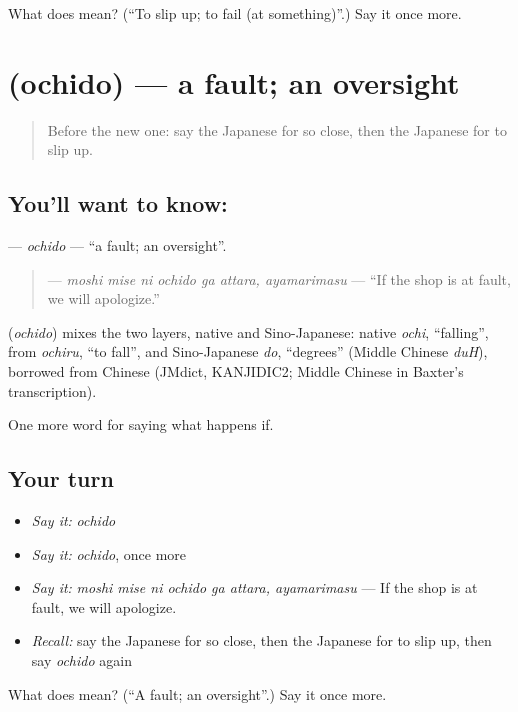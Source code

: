 \begin{tcolorbox}[breakable,colback=teal!4,colframe=teal!35!black,title={Before you move on}]
What does  mean? (\textquotedblleft{}To slip up; to fail (at something)\textquotedblright{}.) Say it once more.
\end{tcolorbox}
\section[\texorpdfstring{\ja{おちど} (ochido)}{おちど (ochido)}]{ (ochido) — a fault; an oversight}

\label{lesson:JA-C518-ochido}



\begin{quote}
Before the new one: say the Japanese for so close, then the Japanese for to slip up.
\end{quote}

\subsection*{You'll want to know: }
\textbf{} — \emph{ochido} — \textquotedblleft{}a fault; an oversight\textquotedblright{}.

\begin{quote}
\textbf{   } — \emph{moshi mise ni ochido ga attara, ayamarimasu} — \textquotedblleft{}If the shop is at fault, we will apologize.\textquotedblright{}
\end{quote}

\begin{cousinweb}
\textbf{} (\emph{ochido}) mixes the two layers, native and Sino-Japanese: native \emph{ochi}, \textquotedblleft{}falling\textquotedblright{}, from \emph{ochiru}, \textquotedblleft{}to fall\textquotedblright{}, and Sino-Japanese \emph{do}, \textquotedblleft{}degrees\textquotedblright{} (Middle Chinese \emph{duH}), borrowed from Chinese (JMdict, KANJIDIC2; Middle Chinese in Baxter's transcription).
\end{cousinweb}

\begin{grammarlens}[title={What you've built}]
One more word for saying what happens if.
\end{grammarlens}

\subsection*{Your turn}
\begin{itemize}
\raggedright
  \item \emph{Say it:} \emph{ochido}
  \item \emph{Say it:} \emph{ochido}, once more
  \item \emph{Say it:} \emph{moshi mise ni ochido ga attara, ayamarimasu} — If the shop is at fault, we will apologize.
  \item \emph{Recall:} say the Japanese for so close, then the Japanese for to slip up, then say \emph{ochido} again
\end{itemize}

\begin{tcolorbox}[breakable,colback=teal!4,colframe=teal!35!black,title={Before you move on}]
What does  mean? (\textquotedblleft{}A fault; an oversight\textquotedblright{}.) Say it once more.
\end{tcolorbox}
